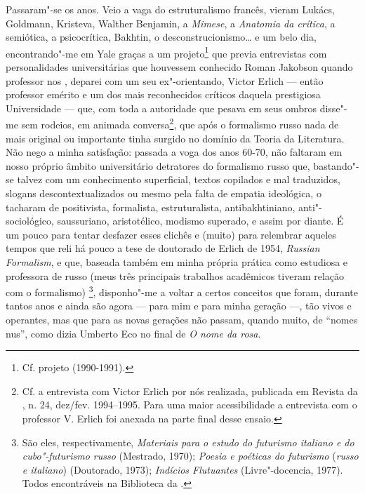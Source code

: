 Passaram"-se os anos. Veio a vaga do estruturalismo francês, vieram
Lukács, Goldmann, Kristeva, Walther Benjamin, a \emph{Mimese}, a
\emph{Anatomia da crítica}, a semiótica, a psicocrítica, Bakhtin, o
desconstrucionismo\ldots{} e um belo dia, encontrando"-me em Yale graças a um
projeto\footnote{Cf. projeto  (1990-1991).} que previa
entrevistas com personalidades universitárias que houvessem conhecido
Roman Jakobson quando professor nos , deparei com um seu
ex"-orientando, Victor Erlich --- então professor emérito e um dos mais
reconhecidos críticos daquela prestigiosa Universidade --- que, com toda
a autoridade que pesava em seus ombros disse"-me sem rodeios, em animada
conversa\footnote{Cf. a entrevista com Victor Erlich por nós realizada,
  publicada em Revista da , n. 24, dez/fev. 1994--1995. Para uma maior
  acessibilidade a entrevista com o professor V. Erlich foi anexada na
  parte final desse ensaio.}, que após o formalismo russo nada de mais
original ou importante tinha surgido no domínio da Teoria da Literatura.
Não nego a minha satisfação: passada a voga dos anos 60-70, não faltaram
em nosso próprio âmbito universitário detratores do formalismo russo
que, bastando"-se talvez com um conhecimento superficial, textos
copilados e mal traduzidos, slogans descontextualizados ou mesmo pela
falta de empatia ideológica, o tacharam de positivista, formalista,
estruturalista, antibakhtiniano, anti"-sociológico, saussuriano,
aristotélico, modismo superado, e assim por diante. É um pouco para
tentar desfazer esses clichês e (muito) para relembrar aqueles tempos
que reli há pouco a tese de doutorado de Erlich de 1954, \emph{Russian
Formalism}, e que, baseada também em minha própria prática como
estudiosa e professora de russo (meus três principais trabalhos
acadêmicos tiveram relação com o formalismo) \footnote{São eles,
  respectivamente, \emph{Materiais para o estudo do futurismo italiano e
  do cubo"-futurismo russo} (Mestrado, 1970); \emph{Poesia e poéticas do
  futurismo} (\emph{russo e italiano}) (Doutorado, 1973); \emph{Indícios
  Flutuantes} (Livre"-docencia, 1977). Todos encontráveis na Biblioteca
  da .}, disponho"-me a voltar a certos conceitos que foram, durante
tantos anos e ainda são agora --- para mim e para minha geração ---, tão
vivos e operantes, mas que para as novas gerações não passam, quando
muito, de ``nomes nus'', como dizia Umberto Eco no final de \emph{O nome
da rosa}.


